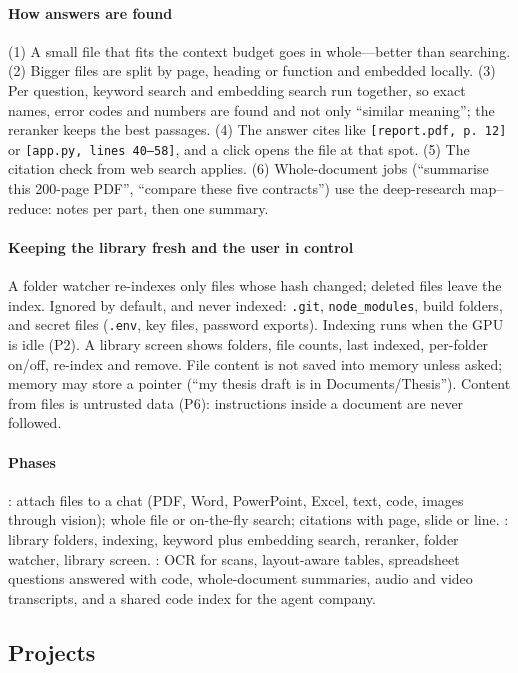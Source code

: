 \paragraph{How answers are found} (1) A small file that fits the context budget goes in whole---better than searching. (2) Bigger files are split by page, heading or function and embedded locally. (3) Per question, keyword search and embedding search run together, so exact names, error codes and numbers are found and not only ``similar meaning''; the reranker keeps the best passages. (4) The answer cites like \texttt{[report.pdf, p.~12]} or \texttt{[app.py, lines 40--58]}, and a click opens the file at that spot. (5) The citation check from web search applies. (6) Whole-document jobs (``summarise this 200-page PDF'', ``compare these five contracts'') use the deep-research map--reduce: notes per part, then one summary.

\paragraph{Keeping the library fresh and the user in control} A folder watcher re-indexes only files whose hash changed; deleted files leave the index. Ignored by default, and never indexed: \texttt{.git}, \texttt{node\_modules}, build folders, and secret files (\texttt{.env}, key files, password exports). Indexing runs when the GPU is idle (P2). A library screen shows folders, file counts, last indexed, per-folder on/off, re-index and remove. File content is not saved into memory unless asked; memory may store a pointer (``my thesis draft is in Documents/Thesis''). Content from files is untrusted data (P6): instructions inside a document are never followed.

\paragraph{Phases} : attach files to a chat (PDF, Word, PowerPoint, Excel, text, code, images through vision); whole file or on-the-fly search; citations with page, slide or line. : library folders, indexing, keyword plus embedding search, reranker, folder watcher, library screen. : OCR for scans, layout-aware tables, spreadsheet questions answered with code, whole-document summaries, audio and video transcripts, and a shared code index for the agent company.

\subsection{Projects}

